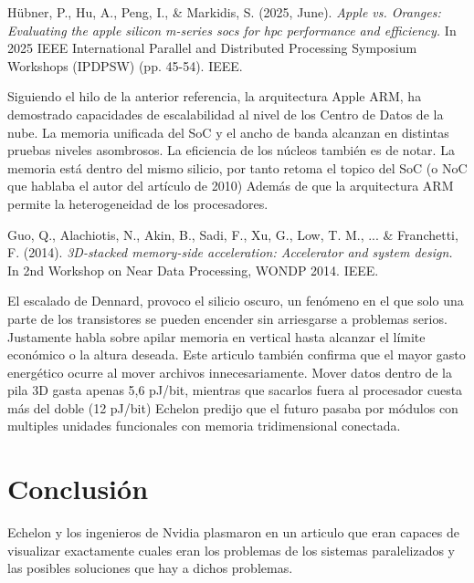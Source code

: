 \documentclass[12pt,a4paper,twoside,openright]{report}
\begin{document}
\bigskip

\begin{tcolorbox}[
    blanker,
    left=12pt, right=12pt,
    top=8pt, bottom=8pt,
    before skip=10pt, after skip=10pt
]
\small
Hübner, P., Hu, A., Peng, I., \& Markidis, S. (2025, June). \emph{Apple vs. Oranges: Evaluating the apple silicon m-series socs for hpc performance and efficiency.} In 2025 IEEE International Parallel and Distributed Processing Symposium Workshops (IPDPSW) (pp. 45-54). IEEE.
\end{tcolorbox}

Siguiendo el hilo de la anterior referencia, la arquitectura Apple ARM, ha demostrado capacidades de escalabilidad al nivel de los Centro de Datos de la nube.
La memoria unificada del SoC y el ancho de banda alcanzan en distintas pruebas niveles asombrosos.
La eficiencia de los núcleos también es de notar. La memoria está dentro del mismo silicio, por tanto retoma el topico del SoC (o NoC que hablaba el autor del artículo de 2010)
Además de que la arquitectura ARM permite la heterogeneidad de los procesadores. 

\bigskip

\begin{tcolorbox}[
    blanker,
    left=12pt, right=12pt,
    top=8pt, bottom=8pt,
    before skip=10pt, after skip=10pt
]
\small
Guo, Q., Alachiotis, N., Akin, B., Sadi, F., Xu, G., Low, T. M., ... \& Franchetti, F. (2014). \emph{3D-stacked memory-side acceleration: Accelerator and system design.} In 2nd Workshop on Near Data Processing, WONDP 2014. IEEE.
\end{tcolorbox}

El escalado de Dennard, provoco el silicio oscuro, un fenómeno en el que solo una parte de los transistores se pueden encender sin arriesgarse a problemas serios.
Justamente habla sobre apilar memoria en vertical hasta alcanzar el límite económico o la altura deseada.
Este articulo también confirma que el mayor gasto energético ocurre al mover archivos innecesariamente.
Mover datos dentro de la pila 3D gasta apenas 5,6 pJ/bit, mientras que sacarlos fuera al procesador cuesta más del doble (12 pJ/bit)
Echelon predijo que el futuro pasaba por módulos con multiples unidades funcionales con memoria tridimensional conectada.
\chapter{Conclusión}
\label{cap:conclusion}
Echelon y los ingenieros de Nvidia plasmaron en un articulo que eran capaces de visualizar exactamente cuales eran los problemas de los sistemas paralelizados y las posibles soluciones que hay a dichos problemas.
\end{document}
